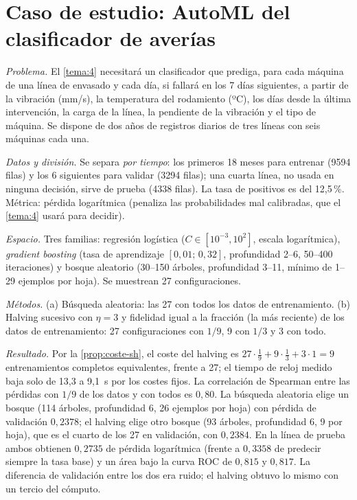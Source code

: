 \section{Caso de estudio: AutoML del clasificador de averías}

\begin{ejemplo}\label{ej:caso-automl}
\emph{Problema.} El \cref{tema:4} necesitará un clasificador que prediga, para cada máquina de una línea de envasado y cada día, si fallará en los 7 días siguientes, a partir de la vibración (mm/s), la temperatura del rodamiento (ºC), los días desde la última intervención, la carga de la línea, la pendiente de la vibración y el tipo de máquina. Se dispone de dos años de registros diarios de tres líneas con seis máquinas cada una.

\emph{Datos y división.} Se separa \emph{por tiempo}: los primeros 18 meses para entrenar (9594 filas) y los 6 siguientes para validar (3294 filas); una cuarta línea, no usada en ninguna decisión, sirve de prueba (4338 filas). La tasa de positivos es del 12{,}5\,\%. Métrica: pérdida logarítmica (penaliza las probabilidades mal calibradas, que el \cref{tema:4} usará para decidir).

\emph{Espacio.} Tres familias: regresión logística ($C\in[10^{-3},10^{2}]$, escala logarítmica), \emph{gradient boosting} (tasa de aprendizaje $[0{,}01;\,0{,}32]$, profundidad 2--6, 50--400 iteraciones) y bosque aleatorio (30--150 árboles, profundidad 3--11, mínimo de 1--29 ejemplos por hoja). Se muestrean 27 configuraciones.

\emph{Métodos.} (a) Búsqueda aleatoria: las 27 con todos los datos de entrenamiento. (b) Halving sucesivo con $\eta=3$ y fidelidad igual a la fracción (la más reciente) de los datos de entrenamiento: 27 configuraciones con $1/9$, 9 con $1/3$ y 3 con todo.

\emph{Resultado.} Por la \cref{prop:coste-sh}, el coste del halving es $27\cdot\tfrac19+9\cdot\tfrac13+3\cdot1=9$ entrenamientos completos equivalentes, frente a 27; el tiempo de reloj medido baja solo de 13{,}3 a 9{,}1~s por los costes fijos. La correlación de Spearman entre las pérdidas con $1/9$ de los datos y con todos es $0{,}80$. La búsqueda aleatoria elige un bosque (114 árboles, profundidad 6, 26 ejemplos por hoja) con pérdida de validación $0{,}2378$; el halving elige otro bosque (93 árboles, profundidad 6, 9 por hoja), que es el cuarto de los 27 en validación, con $0{,}2384$. En la línea de prueba ambos obtienen $0{,}2735$ de pérdida logarítmica (frente a $0{,}3358$ de predecir siempre la tasa base) y un área bajo la curva ROC de $0{,}815$ y $0{,}817$. La diferencia de validación entre los dos era ruido; el halving obtuvo lo mismo con un tercio del cómputo.
\end{ejemplo}

